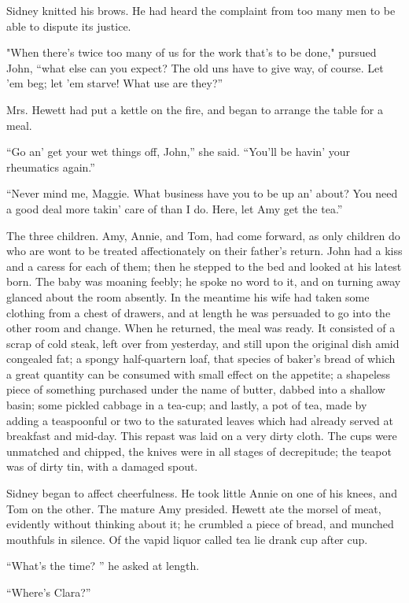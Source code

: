 Sidney knitted his brows. He had heard the complaint from too many men
to be able to dispute its justice.

"When there's twice too many of us for {}the work that's to be done,"
pursued John, ``what else can you expect? The old uns have to give way,
of course. Let 'em beg; let 'em starve! What use are they?''

Mrs. Hewett had put a kettle on the fire, and began to arrange the table
for a meal.

``Go an' get your wet things off, John,'' she said. ``You'll be havin'
your rheumatics again.''

``Never mind me, Maggie. What business have you to be up an' about? You
need a good deal more takin' care of than I do. Here, let Amy get the
tea.''

The three children. Amy, Annie, and Tom, had come forward, as only
children do who are wont to be treated affectionately on their father's
return. John had a kiss and a caress for each of them; then he stepped
to the bed and looked at his latest born. The baby was moaning feebly;
he spoke no word to it, and on turning away glanced about the room
absently. In the meantime his wife had taken some clothing from a chest
of drawers, and at length he was persuaded to {}go into the other room
and change. When he returned, the meal was ready. It consisted of a
scrap of cold steak, left over from yesterday, and still upon the
original dish amid congealed fat; a spongy half-quartern loaf, that
species of baker's bread of which a great quantity can be consumed with
small effect on the appetite; a shapeless piece of something purchased
under the name of butter, dabbed into a shallow basin; some pickled
cabbage in a tea-cup; and lastly, a pot of tea, made by adding a
teaspoonful or two to the saturated leaves which had already served at
breakfast and mid-day. This repast was laid on a very dirty cloth. The
cups were unmatched and chipped, the knives were in all stages of
decrepitude; the teapot was of dirty tin, with a damaged spout.

Sidney began to affect cheerfulness. He took little Annie on one of his
knees, and Tom on the other. The mature Amy presided. Hewett ate the
morsel of meat, evidently without thinking about it; he crumbled a piece
of bread, and munched mouthfuls in {}silence. Of the vapid liquor called
tea lie drank cup after cup.

``What's the time? '' he asked at length.

``Where's Clara?''

